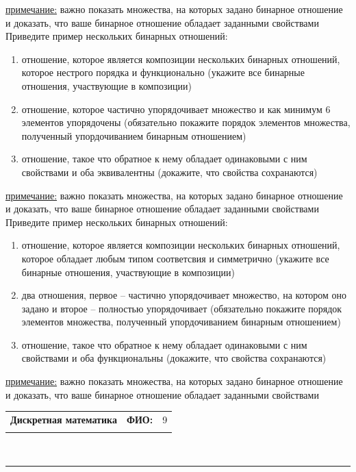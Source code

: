 \documentclass[10pt]{exam}
\newcommand{\class}{Дискретная математика}
\newcommand{\examdate}{}
\begin{document}
\begin{questions}
\underline{примечание:} важно показать  множества, на которых задано бинарное отношение и доказать, что ваше бинарное отношение обладает заданными свойствами
\question
Приведите  пример  нескольких бинарных отношений:
\begin{enumerate}
	\renewcommand{\labelenumi}{\alph{enumi})}
	\item отношение, которое является композиции нескольких бинарных отношений,  которое  нестрого порядка и функционально (укажите все бинарные отношения, участвующие в композиции)
	\item отношение, которое частично упорядочивает множество и как минимум 6 элементов упорядочены (обязательно покажите порядок элементов множества, полученный упордочиванием бинарным отношением)
	\item отношение, такое что обратное к нему  обладает одинаковыми с ним свойствами и оба эквивалентны (докажите, что свойства сохранаются)
\end{enumerate}

\underline{примечание:} важно показать  множества, на которых задано бинарное отношение и доказать, что ваше бинарное отношение обладает заданными свойствами
\question
Приведите  пример  нескольких бинарных отношений:
\begin{enumerate}
	\renewcommand{\labelenumi}{\alph{enumi})}
	\item отношение, которое является композиции нескольких бинарных отношений,  которое  обладает любым типом соответсвия  и симметрично (укажите все бинарные отношения, участвующие в композиции)
	\item два отношения, первое -- частично упорядочивает множество, на котором оно задано и второе -- полностью упорядочивает (обязательно покажите порядок элементов множества, полученный упордочиванием бинарным отношением)
	\item отношение, такое что обратное к нему  обладает одинаковыми с ним свойствами и оба функциональны (докажите, что свойства сохранаются)
\end{enumerate}

\underline{примечание:} важно показать  множества, на которых задано бинарное отношение и доказать, что ваше бинарное отношение обладает заданными свойствами


\end{questions}
\newpage
\begin{flushright}
\begin{tabular}{p{2.8in} r l}
\textbf{\class} & \textbf{ФИО:} &9\\

\textbf{\examdate} &&\\
\end{tabular}\\
\end{flushright}
\rule[1ex]{\textwidth}{.1pt}
\end{document}
